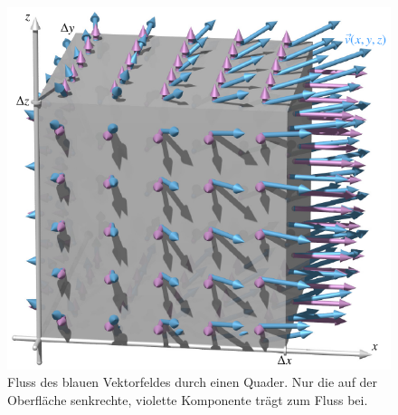 %
%
%
\begin{figure}
\centering
\includegraphics{chapters/050-gauss/images/kont.pdf}
\caption{Fluss des blauen Vektorfeldes durch einen Quader.
Nur die auf der Oberfläche senkrechte, violette Komponente trägt
zum Fluss bei.
\label{buch:gauss:fig:kont}}
\end{figure}
